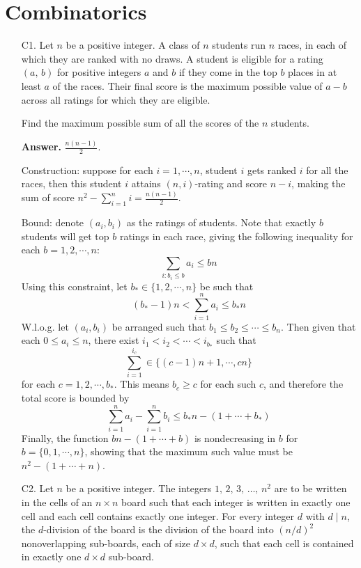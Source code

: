 \documentclass[11pt,a4paper]{article}
\begin{document}
    \section*{Combinatorics}
    \begin{enumerate}
    	\item [C1.] 
    	Let $n$ be a positive integer. A class of $n$ students run $n$ races, in each of which they are ranked with no draws. A student is eligible for a rating $(a,\,b)$ for positive integers $a$ and $b$ if they come in the top $b$ places in at least $a$ of the races. Their final score is the maximum possible value of $a-b$ across all ratings for which they are eligible.
    	
    	Find the maximum possible sum of all the scores of the $n$ students.
    	
    	\textbf{Answer. }$\frac{n(n-1)}{2}$. 
    	
    	Construction: suppose for each $i=1, \cdots, n$, 
    	student $i$ gets ranked $i$ for all the races, 
    	then this student $i$ attains $(n, i)$-rating and score $n - i$, making the sum of score 
    	$n^2 - \sum_{i=1}^n i = \frac{n(n-1)}{2}$. 
    	
    	Bound: denote $(a_i, b_i)$ as the ratings of students. 
    	Note that exactly $b$ students will get top $b$ ratings in each race, giving the following inequality for each $b=1, 2, \cdots, n:$
    	\[
    	\sum_{i: b_i\le b} a_i\le bn
    	\]
    	Using this constraint, let $b_*\in \{1, 2, \cdots, n\}$ be such that 
    	\[
    	(b_* - 1) n < \sum_{i=1}^n a_i \le b_*n
    	\]
    	W.l.o.g. let $(a_i, b_i)$ be arranged such that 
    	$b_1\le b_2\le \cdots \le b_n$. 
    	Then given that each $0\le a_i\le n$, 
    	there exist $i_1<i_2<\cdots < i_{b_*}$ such that 
    	\[
    	\sum_{i=1}^{i_c} \in \{(c-1)n + 1, \cdots, cn\}
    	\]
    	for each $c=1, 2, \cdots, b_*$. 
    	This means $b_c\ge c$ for each such $c$, 
    	and therefore the total score is bounded by 
    	\[
    	\sum_{i=1}^n a_i - \sum_{i=1}^n b_i
    	\le b_*n - (1 + \cdots + b_*)
    	\]
    	Finally, the function $bn - (1 + \cdots + b)$ is nondecreasing in $b$ for $b=\{0, 1, \cdots, n\}$, 
    	showing that the maximum such value must be 
    	$n^2 - (1 + \cdots + n)$. 
    	
    	\item [C2.]
    	Let $n$ be a positive integer. The integers $1,\,2,\,3,\,\ldots,\,n^2$ are to be written in the cells of an $n\times n$ board such that each integer is written in exactly one cell and each cell contains exactly one integer. For every integer $d$ with $d\mid n$, the $d$-division of the board is the division of the board into $(n/d)^2$ nonoverlapping sub-boards, each of size $d\times d$, such that each cell is contained in exactly one $d\times d$ sub-board.
    	

\end{enumerate}
\end{document}
